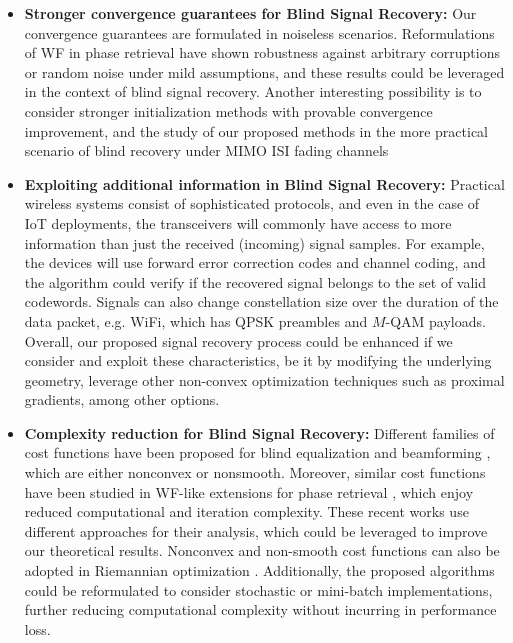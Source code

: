 \begin{itemize}
	\item \textbf{Stronger convergence guarantees for Blind Signal Recovery:} 
	Our convergence guarantees are formulated in noiseless scenarios. Reformulations of WF in phase retrieval have shown robustness against arbitrary corruptions \cite{Zhang2016mediantruncatedwf} or random noise \cite{Cai2016thresholdedwf,Lazreg2018optimasparselrobustwf} under mild assumptions, and these results could be leveraged in the context of blind signal recovery. Another interesting possibility is to consider stronger initialization methods with provable convergence improvement, and the study of our proposed methods in the more practical scenario of blind recovery under MIMO ISI fading channels
	
	\item \textbf{Exploiting additional information in Blind Signal Recovery:} 
	Practical wireless systems consist of sophisticated protocols, and even in the case of IoT deployments, the transceivers will commonly have access to more information than just the received (incoming) signal samples. For example, the devices will use forward error correction codes and channel coding, and the algorithm could verify if the recovered signal belongs to the set of valid codewords. Signals can also change constellation size over the duration of the data packet, e.g. WiFi, which has QPSK preambles and $M$-QAM payloads. Overall, our proposed signal recovery process could be enhanced if we consider and exploit these characteristics, be it by modifying the underlying geometry, leverage other non-convex optimization techniques such as proximal gradients, among other options.
	
	\item \textbf{Complexity reduction for Blind Signal Recovery:}
	Different families of cost functions have been proposed for blind equalization and beamforming \cite{Benveniste1980bgr,Sato1975,Shalvi1990}, which are either nonconvex or nonsmooth. Moreover, similar cost functions have been studied in WF-like extensions for phase retrieval \cite{Zhang2016mediantruncatedwf,Cai2016thresholdedwf,Lazreg2018optimasparselrobustwf}, which enjoy reduced computational and iteration complexity. These recent works use different approaches for their analysis, which could be leveraged to improve our theoretical results. Nonconvex and non-smooth cost functions can also be adopted in Riemannian optimization \cite{Kovnatsky2016madmmriemann,Absil2019nonsmoothriemannian}. Additionally, the proposed algorithms could be reformulated to consider stochastic or mini-batch implementations, further reducing computational complexity without incurring in performance loss.
	

\end{itemize}
